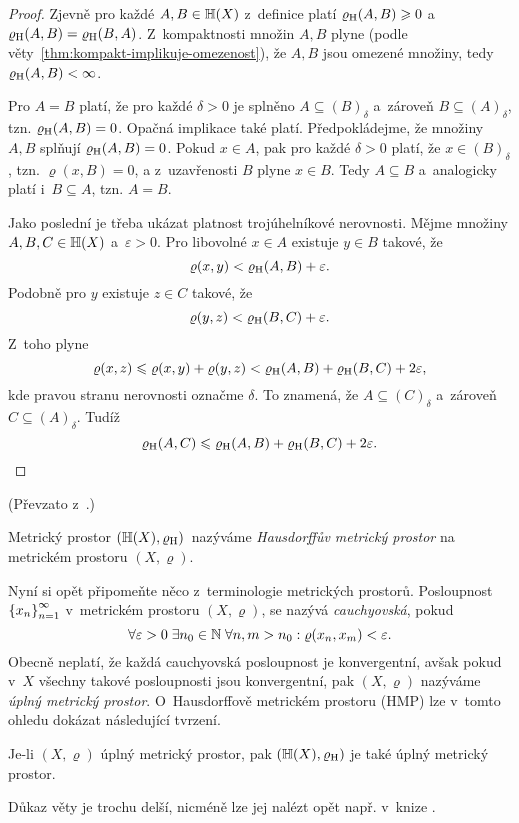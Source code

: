 \begin{proof}
    Zjevně pro každé $A,B\in\mathbb{H}(X)$ z~definice platí $\varrho_\textup{H}(A,B)\geqslant 0$ a~$\varrho_\textup{H}(A,B)=\varrho_\textup{H}(B,A)$. Z~kompaktnosti množin $A,B$ plyne (podle věty~\ref{thm:kompakt-implikuje-omezenost}), že $A,B$ jsou omezené množiny, tedy $\varrho_\textup{H}(A,B)<\infty$.
    
    Pro $A=B$ platí, že pro každé $\delta>0$ je splněno $A\subseteq (B)_\delta$ a~zároveň $B\subseteq (A)_\delta$, tzn. $\varrho_\textup{H}(A,B)=0$. Opačná implikace také platí. Předpokládejme, že množiny $A,B$ splňují $\varrho_\textup{H}(A,B)=0$. Pokud $x\in A$, pak pro každé $\delta>0$ platí, že $x\in (B)_\delta$, tzn. $\varrho(x,B)=0$, a z~uzavřenosti $B$ plyne $x\in B$. Tedy $A\subseteq B$ a~analogicky platí i~$B\subseteq A$, tzn. $A=B$.

    Jako poslední je třeba ukázat platnost trojúhelníkové nerovnosti. Mějme množiny $A,B,C\in\mathbb{H}(X)$ a~$\varepsilon>0$. Pro libovolné $x\in A$ existuje $y\in B$ takové, že
    \[\varrho(x,y)<\varrho_\textup{H}(A,B)+\varepsilon.\]
    Podobně pro $y$ existuje $z\in C$ takové, že
    \[\varrho(y,z)<\varrho_\textup{H}(B,C)+\varepsilon.\]
    Z~toho plyne
    \[\varrho(x,z)\leqslant\varrho(x,y)+\varrho(y,z)<\varrho_\textup{H}(A,B)+\varrho_\textup{H}(B,C)+2\varepsilon,\]
    kde pravou stranu nerovnosti označme $\delta$. To znamená, že $A\subseteq (C)_\delta$ a~zároveň $C\subseteq (A)_\delta$. Tudíž
    \[\varrho_\textup{H}(A,C)\leqslant\varrho_\textup{H}(A,B)+\varrho_\textup{H}(B,C)+2\varepsilon.\]
\end{proof}
(Převzato z~\citep[str. 72]{Edgar2008}.)
\begin{definition}\label{def:hausdorffuv-mp}
    Metrický prostor $(\mathbb{H}(X),\varrho_\textup{H})$~nazýváme \emph{Hausdorffův metrický prostor} na metrickém prostoru $(X,\varrho)$.
\end{definition}
Nyní si opět připomeňte něco z~terminologie metrických prostorů. Posloupnost $\left\{x_n\right\}_{n=1}^\infty$ v~metrickém prostoru $(X,\varrho)$, se nazývá \emph{cauchyovská}, pokud
\[\forall\varepsilon>0\;\exists n_0\in\mathbb{N}\;\forall n,m>n_0: \varrho(x_n,x_m)<\varepsilon.\]
Obecně neplatí, že každá cauchyovská posloupnost je konvergentní, avšak pokud v~$X$ všechny takové posloupnosti jsou konvergentní, pak $(X,\varrho)$ nazýváme \emph{úplný metrický prostor}. O~Hausdorffově metrickém prostoru (HMP) lze v~tomto ohledu dokázat následující tvrzení.
\begin{theorem}\label{thm:uplnost-hmp}
    Je-li $(X,\varrho)$ úplný metrický prostor, pak $(\mathbb{H}(X),\varrho_\textup{H})$ je také úplný metrický prostor.
\end{theorem}
Důkaz věty je trochu delší, nicméně lze jej nalézt opět např. v~knize \citep[str. 72]{Edgar2008}.